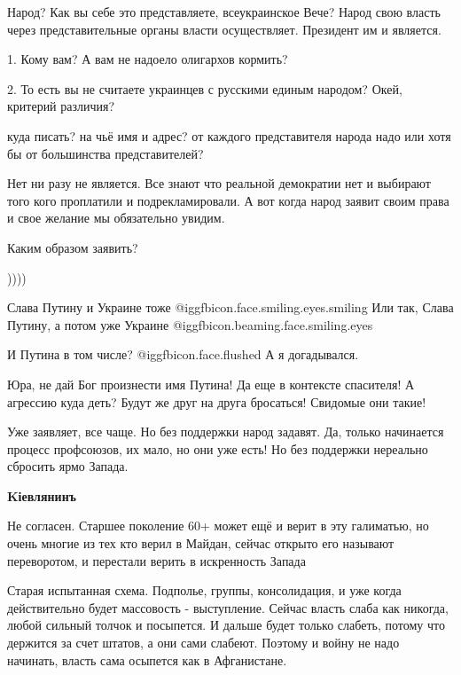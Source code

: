 \begin{itemize}
Народ? Как вы себе это представляете, всеукраинское Вече? Народ свою власть
через представительные органы власти осуществляет. Президент им и является.


1. Кому вам? А вам не надоело олигархов кормить?

2. То есть вы не считаете украинцев с русскими единым народом? Окей, критерий
различия?


куда писать? на чьё имя и адрес? от каждого представителя народа надо или хотя
бы от большинства представителей?


Нет ни разу не является. Все знают что реальной демократии нет и выбирают того
кого проплатили и подрекламировали. А вот когда народ заявит своим права и свое
желание мы обязательно увидим.


Каким образом заявить?

))))

Слава Путину и Украине тоже @igg{fbicon.face.smiling.eyes.smiling} 
Или так, Слава Путину, а потом уже Украине @igg{fbicon.beaming.face.smiling.eyes} 

И Путина в том числе?  @igg{fbicon.face.flushed}  А я догадывался.


Юра, не дай Бог произнести имя Путина! Да еще в контексте спасителя! А агрессию
куда деть? Будут же друг на друга бросаться! Свидомые они такие!


Уже заявляет, все чаще. Но без поддержки народ задавят. Да, только начинается
процесс профсоюзов, их мало, но они уже есть! Но без поддержки нереально
сбросить ярмо Запада.

\textbf{Kіевлянинъ}

Не согласен. Старшее поколение 60+ может ещё и верит в эту галиматью, но очень
многие из тех кто верил в Майдан, сейчас открыто его называют переворотом, и
перестали верить в искренность Запада


Старая испытанная схема. Подполье, группы, консолидация, и уже когда
действительно будет массовость - выступление. Сейчас власть слаба как никогда,
любой сильный толчок и посыпется. И дальше будет только слабеть, потому что
держится за счет штатов, а они сами слабеют. Поэтому и войну не надо начинать,
власть сама осыпется как в Афганистане.


\end{itemize}

